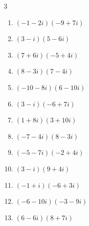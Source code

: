 \begin{multicols}{3}
\begin{enumerate}
        \phantom{$\displaystyle =10+8i$}

  \item $\displaystyle (-1-2i)(-9+7i)$

        \phantom{$\displaystyle =23+11i$}

  \item $\displaystyle (3-i)(5-6i)$

        \phantom{$\displaystyle =9-23i$}

  \item $\displaystyle (7+6i)(-5+4i)$

        \phantom{$\displaystyle =-59-2i$}

  \item $\displaystyle (8-3i)(7-4i)$

        \phantom{$\displaystyle =44-53i$}

  \item $\displaystyle (-10-8i)(6-10i)$

        \phantom{$\displaystyle =-140+52i$}

  \item $\displaystyle (3-i)(-6+7i)$

        \phantom{$\displaystyle =-11+27i$}

  \item $\displaystyle (1+8i)(3+10i)$

        \phantom{$\displaystyle =-77+34i$}

  \item $\displaystyle (-7-4i)(8-3i)$

        \phantom{$\displaystyle =-68-11i$}

  \item $\displaystyle (-5-7i)(-2+4i)$

        \phantom{$\displaystyle =38-6i$}

  \item $\displaystyle (3-i)(9+4i)$

        \phantom{$\displaystyle =31+3i$}

  \item $\displaystyle (-1+i)(-6+3i)$

        \phantom{$\displaystyle =3-9i$}

  \item $\displaystyle (-6-10i)(-3-9i)$

        \phantom{$\displaystyle =-72+84i$}

  \item $\displaystyle (6-6i)(8+7i)$


\end{enumerate}
\end{multicols}

